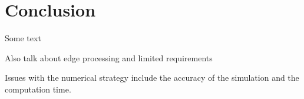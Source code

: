 \chapter{Conclusion}
Some text

Also talk about edge processing and limited requirements

Issues with the numerical strategy include the accuracy of the simulation and the computation time.